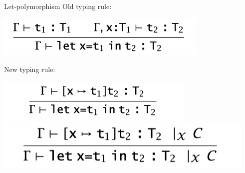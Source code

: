 \documentclass[usenames,dvipsnames]{beamer}
\begin{document}
\begin{frame}{Let-polymorphism}
Old typing rule:
\begin{center}
\includegraphics[scale=0.4]{img/old}
\end{center}

New  typing rule:
\begin{center}
\includegraphics[scale=0.4]{img/new}
\includegraphics[scale=0.3]{img/newconstraint}
\end{center}

\end{frame}

%
\end{document}
